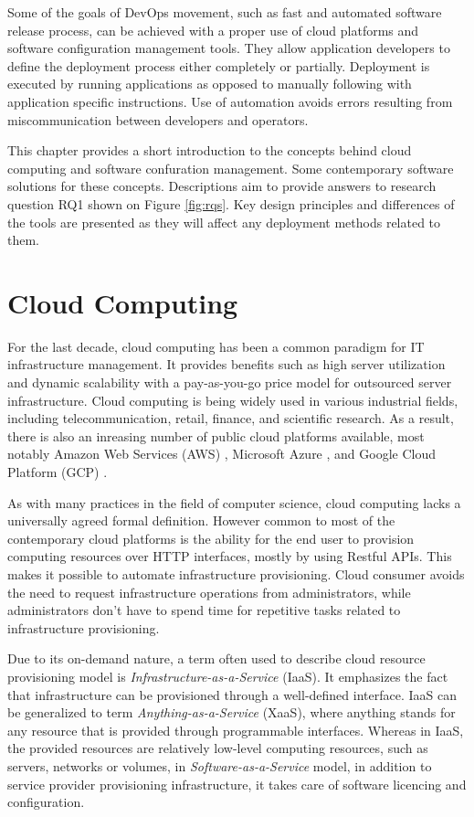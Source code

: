 Some of the goals of DevOps movement, such as fast and automated software
release process, can be achieved with a proper use of cloud platforms and
software configuration management tools. They allow application developers to
define the deployment process either completely or partially. Deployment is
executed by running applications as opposed to manually following with
application specific instructions. Use of automation avoids errors resulting
from miscommunication between developers and operators.

This chapter provides a short introduction to the concepts behind cloud
computing and software confuration management. Some contemporary software
solutions for these concepts. Descriptions aim to provide answers to research
question RQ1 shown on Figure \ref{fig:rqs}. Key design principles and
differences of the tools are presented as they will affect any deployment
methods related to them.

\section{Cloud Computing}

For the last decade, cloud computing has been a common paradigm for IT
infrastructure management. It provides benefits such as high server utilization
and dynamic scalability with a pay-as-you-go price model for outsourced server
infrastructure. Cloud computing is being widely used in various industrial
fields, including telecommunication, retail, finance, and scientific research.
As a result, there is also an inreasing number of public cloud platforms
available, most notably Amazon Web Services (AWS) \citep{aws}, Microsoft Azure
\cite{azure}, and Google Cloud Platform (GCP) \cite{gcp}.

As with many practices in the field of computer science, cloud computing lacks
a universally agreed formal definition. However common to most of the
contemporary cloud platforms is the ability for the end user to provision
computing resources over HTTP interfaces, mostly by using Restful APIs. This
makes it possible to automate infrastructure provisioning. Cloud consumer
avoids the need to request infrastructure operations from administrators, while
administrators don't have to spend time for repetitive tasks related to
infrastructure provisioning.

Due to its on-demand nature, a term often used to describe cloud resource
provisioning model is \textit{Infrastructure-as-a-Service} (IaaS). It
emphasizes the fact that infrastructure can be provisioned through a
well-defined interface. IaaS can be generalized to term
\textit{Anything-as-a-Service} (XaaS), where anything stands for any resource
that is provided through programmable interfaces. Whereas in IaaS, the provided
resources are relatively low-level computing resources, such as servers,
networks or volumes, in \textit{Software-as-a-Service} model, in addition to
service provider provisioning infrastructure, it takes care of software
licencing and configuration.

